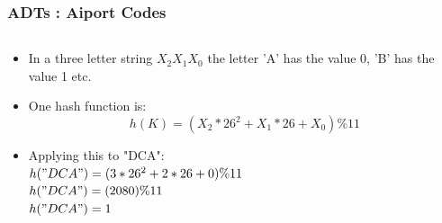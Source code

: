 \begin{frame}[fragile]
\frametitle{ADTs : Aiport Codes}
\begin{columns}[T]

\begin{column}{0.35\textwidth}
\begin{itemize}[<+->]
\item In a three letter string $X_2 X_1 X_0$ the letter 'A' has the value 0, 'B' has the
value 1 etc.
\item One hash function is:
\[
h(K) = (X_2*26^2 + X_1*26 + X_0)\%11
\]
\item Applying this to "DCA":\\

$ h("DCA") = (3*26^2 + 2*26 + 0)\%11$\\

$ h("DCA") = (2080)\%11$\\

$ h("DCA") = 1 $
\end{itemize}
\end{column}


\end{columns}
\end{frame}
